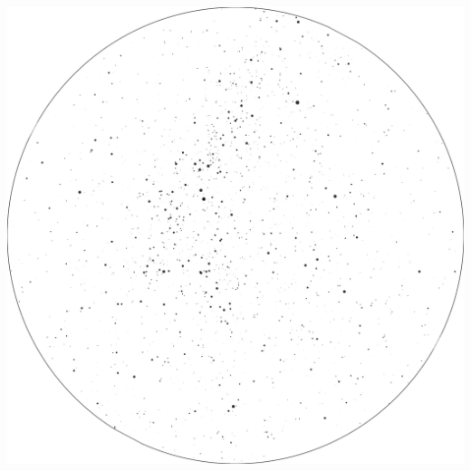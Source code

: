 \documentclass{./SAS-class-skygen}
\begin{document}
	\vspace{0.5cm}
    \begin{center}
    \includegraphics[width=\textwidth]{./pics/skychart37.png}
    \end{center}
    
    
\end{document}
